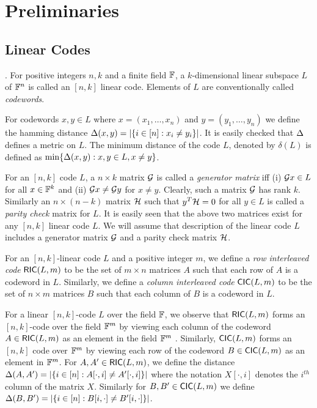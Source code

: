 \section{Preliminaries}\label{sec:prelims}
\subsection{Linear Codes}
\begin{definition}\label{defn:lincode}
.
For positive integers $n,k$ and a finite field $\mathbb{F}$, a $k$-dimensional linear subspace $L$ of $\mathbb{F}^n$ is called an $[n,k]$ linear code. Elements of $L$ are conventionally called {\em codewords}. 
\end{definition}

For codewords $x,y\in L$ where $x=(x_1,\ldots,x_n)$ and $y=(y_1,\ldots,y_n)$ we define the hamming distance $\Delta(x,y)=|\{i\in [n]: x_i\neq y_i\}|$. It is easily checked that $\Delta$ defines a metric on $L$. The minimum distance of the code $L$, denoted by $\delta(L)$ is defined as $\min\{\Delta(x,y):x,y\in L, x\neq y\}$.

For an $[n,k]$ code $L$, a $n\times k$ matrix $\mathcal{G}$ is called a {\em generator matrix} iff (i) $\mathcal{G} x\in L$ for all $x \in \mathbb{F}^k$ and (ii) $\mathcal{G} x\neq \mathcal{G} y$ for $x\neq y$. Clearly, such a matrix $\mathcal{G}$ has rank $k$. Similarly an $n\times (n-k)$ matrix $\mathcal{H}$ such that $y^T \mathcal{H} = 0$ for all $y\in L$ is called a {\em parity check} matrix for $L$. It is easily seen that the above two matrices exist for any $[n,k]$ linear code $L$. We will assume that description of the linear code $L$ includes a generator matrix $\mathcal{G}$ and a parity check matrix $\mathcal{H}$.

\begin{definition}\label{defn:interleavedcode}
For an $[n,k]$-linear code $L$ and a positive integer $m$, we define a {\em row interleaved code} $\mathsf{RIC}(L,m)$ to be the set of $m\times n$ matrices $A$ such that each row of $A$ is a codeword in $L$. Similarly, we define a {\em column interleaved code} $\mathsf{CIC}(L,m)$ to be the set of $n\times m$ matrices $B$ such that each column of $B$ is a codeword in $L$.
\end{definition}

For a linear $[n,k]$-code $L$ over the field $\mathbb{F}$, we observe that $\mathsf{RIC}(L,m)$ forms an $[n,k]$-code over the field $\mathbb{F}^m$ by viewing each column of the codeword $A\in \mathsf{RIC}(L,m)$ as an element in the field $\mathbb{F}^m$ . Similarly, $\mathsf{CIC}(L,m)$ forms an $[n,k]$ code over $\mathbb{F}^m$ by viewing each row of the codeword $B\in \mathsf{CIC}(L,m)$ as an element in $\mathbb{F}^m$. For $A,A'\in \mathsf{RIC}(L,m)$, we define the distance $\Delta(A,A')=|\{i\in [n]: A[\cdot,i]\neq A'[\cdot,i]\}|$ where the notation $X[\cdot,i]$ denotes the $i^{th}$ column of the matrix $X$. Similarly for $B,B'\in \mathsf{CIC}(L,m)$ we define $\Delta(B,B')=|\{i\in [n]: B[i,\cdot]\neq B'[i,\cdot]\}|$.
 
